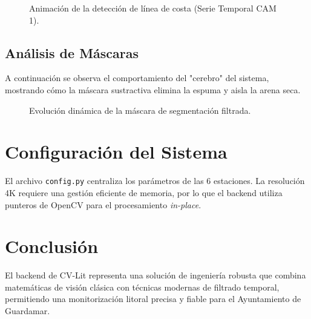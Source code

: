 \documentclass[12pt,a4paper]{article}
\begin{document}
\begin{figure}[H]
    \centering
    \caption{Animación de la detección de línea de costa (Serie Temporal CAM 1).}
\end{figure}

\subsection{Análisis de Máscaras}
A continuación se observa el comportamiento del "cerebro" del sistema, mostrando cómo la máscara sustractiva elimina la espuma y aisla la arena seca.

\begin{figure}[H]
    \centering
    \caption{Evolución dinámica de la máscara de segmentación filtrada.}
\end{figure}

\section{Configuración del Sistema}
El archivo \texttt{config.py} centraliza los parámetros de las 6 estaciones. La resolución 4K requiere una gestión eficiente de memoria, por lo que el backend utiliza punteros de OpenCV para el procesamiento \textit{in-place}.

\section{Conclusión}
El backend de CV-Lit representa una solución de ingeniería robusta que combina matemáticas de visión clásica con técnicas modernas de filtrado temporal, permitiendo una monitorización litoral precisa y fiable para el Ayuntamiento de Guardamar.
\end{document}
